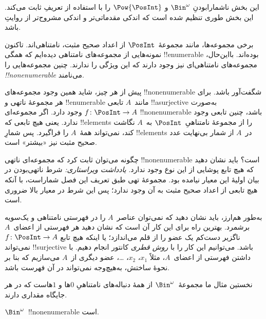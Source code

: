 \documentclass[../../../include/open-logic-section]{subfiles}
\begin{document}


\begin{editorial}
  این بخش ناشمارابودنِ $\Bin^\omega$ و $\Pow{\PosInt}$ را با استفاده
  از تعریفِ  ثابت می‌کند. این بخش طوری
  تنظیم شده است که اندکی مقدماتی‌تر و اندکی مشروح‌تر از روایتِ
   باشد.
\end{editorial}

برخی مجموعه‌ها، مانند مجموعهٔ~$\PosInt$ از اعداد صحیح مثبت،
نامتناهی‌اند. تاکنون نمونه‌هایی از مجموعه‌های نامتناهی دیده‌ایم که همگی
!!{enumerable} بوده‌اند. بااین‌حال، مجموعه‌های نامتناهی‌ای نیز وجود دارند
که این ویژگی را ندارند. چنین مجموعه‌هایی را \emph{!!{nonenumerable}}
می‌نامند.

پیش از هر چیز، شاید همین وجود مجموعه‌های !!{nonenumerable} شگفت‌آور
باشد. برای هر مجموعهٔ ناتهی و !!{enumerable} مانند~$A$ تابعی !!a{surjective}
به‌صورت $f \colon \PosInt \to A$ وجود دارد. اگر مجموعه‌ای
!!{nonenumerable} باشد، چنین تابعی وجود ندارد. یعنی هیچ تابعی که
!!{element}s را از مجموعهٔ نامتناهیِ~$\PosInt$ به~$A$ نگاشت کند،
نمی‌تواند همهٔ~$A$ را فراگیرد. پس شمارِ !!{element}s در~$A$ از شمار
بی‌نهایت عدد صحیح مثبت نیز «بیشتر» است.

چگونه می‌توان ثابت کرد که مجموعه‌ای ناتهی !!{nonenumerable} است؟ باید نشان
دهید که هیچ تابع پوشایی از این نوع وجود ندارد.
\emph{یادداشت ویراستاری:} شرط ناتهی‌بودن در بیان اولیهٔ این معیار نیامده بود.
مجموعهٔ تهی طبق تعریف این فصل شماراست، با آنکه هیچ تابعی از اعداد صحیح مثبت
به آن وجود ندارد؛ پس این شرط در معیار بالا ضروری است.

 به‌طور
هم‌ارز، باید نشان دهید که نمی‌توان عناصر~$A$ را در فهرستی نامتناهی و
یک‌سویه برشمرد. بهترین راه برای این کار آن است که نشان دهید هر فهرستی
از اعضای~$A$ ناگزیر دست‌کم یک عضو را از قلم می‌اندازد؛ یا
اینکه هیچ تابع $f\colon \PosInt \to A$ نمی‌تواند !!{surjective} باشد.
می‌توانیم این کار را با \emph{روش قطری} کانتور انجام دهیم. با داشتن
فهرستی از اعضای~$A$، مثلاً $x_1$، $x_2$، \dots، عضو دیگری
از~$A$ می‌سازیم که بنا بر نحوهٔ ساختش، به‌هیچ‌وجه نمی‌تواند در آن
فهرست باشد.

نخستین مثال ما مجموعهٔ~$\Bin^\omega$ از همهٔ دنباله‌های نامتناهیِ
$0$ها و $1$هاست که در هر جایگاه مقداری دارند.

\begin{thm}
$\Bin^\omega$~!!{nonenumerable} است.
\end{thm}
\end{document}

